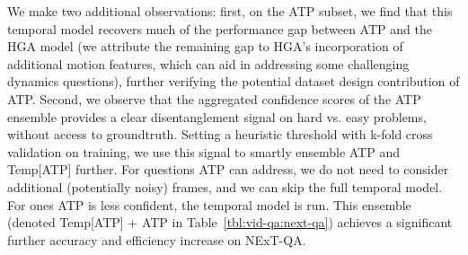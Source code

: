 We make two additional observations: first, on the ATP subset, we find that this temporal model recovers much of the performance gap between ATP and the HGA model (we attribute the remaining gap to HGA's incorporation of additional motion features, which can aid in addressing some challenging dynamics questions), further verifying the potential dataset design contribution of ATP. Second, we observe that the aggregated confidence scores of the ATP ensemble provides a clear disentanglement signal on hard vs. easy problems, without access to groundtruth. 
Setting a heuristic threshold with k-fold cross validation on training, we use this signal to smartly ensemble ATP and Temp[ATP] further. For questions ATP can address, we do not need to consider additional (potentially noisy) frames, and we can skip the full temporal model. For ones ATP is less confident, the temporal model is run. This ensemble (denoted Temp[ATP] + ATP in Table~\ref{tbl:vid-qa:next-qa}) achieves a significant further accuracy and efficiency increase on NExT-QA.

%